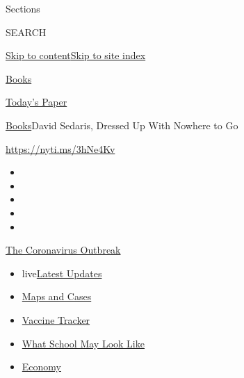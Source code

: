Sections

SEARCH

\protect\hyperlink{site-content}{Skip to
content}\protect\hyperlink{site-index}{Skip to site index}

\href{https://www.nytimes.com/section/books}{Books}

\href{https://myaccount.nytimes.com/auth/login?response_type=cookie\&client_id=vi}{}

\href{https://www.nytimes.com/section/todayspaper}{Today's Paper}

\href{/section/books}{Books}\textbar{}David Sedaris, Dressed Up With
Nowhere to Go

\url{https://nyti.ms/3hNe4Kv}

\begin{itemize}
\item
\item
\item
\item
\item
\end{itemize}

\href{https://www.nytimes.com/news-event/coronavirus?action=click\&pgtype=Article\&state=default\&region=TOP_BANNER\&context=storylines_menu}{The
Coronavirus Outbreak}

\begin{itemize}
\tightlist
\item
  live\href{https://www.nytimes.com/2020/08/01/world/coronavirus-covid-19.html?action=click\&pgtype=Article\&state=default\&region=TOP_BANNER\&context=storylines_menu}{Latest
  Updates}
\item
  \href{https://www.nytimes.com/interactive/2020/us/coronavirus-us-cases.html?action=click\&pgtype=Article\&state=default\&region=TOP_BANNER\&context=storylines_menu}{Maps
  and Cases}
\item
  \href{https://www.nytimes.com/interactive/2020/science/coronavirus-vaccine-tracker.html?action=click\&pgtype=Article\&state=default\&region=TOP_BANNER\&context=storylines_menu}{Vaccine
  Tracker}
\item
  \href{https://www.nytimes.com/interactive/2020/07/29/us/schools-reopening-coronavirus.html?action=click\&pgtype=Article\&state=default\&region=TOP_BANNER\&context=storylines_menu}{What
  School May Look Like}
\item
  \href{https://www.nytimes.com/live/2020/07/31/business/stock-market-today-coronavirus?action=click\&pgtype=Article\&state=default\&region=TOP_BANNER\&context=storylines_menu}{Economy}
\end{itemize}

